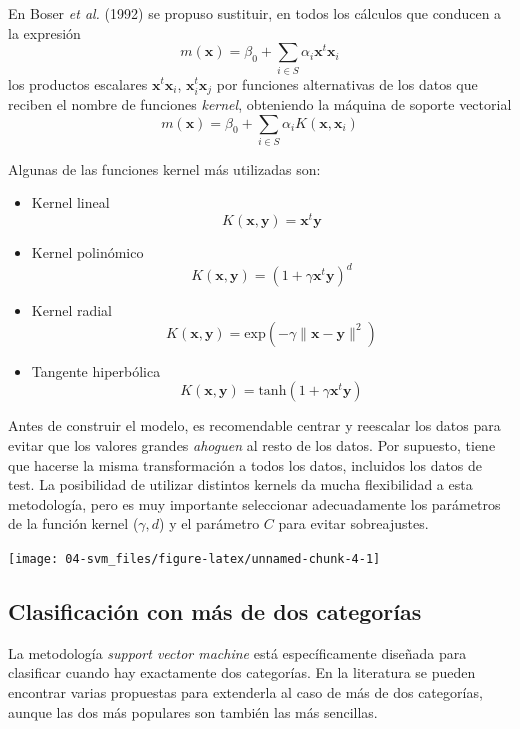 \documentclass[
  spanish,
]{book}
\theoremstyle{break}
\theoremstyle{definition}
\theoremstyle{definition}
\theoremstyle{definition}
\theoremstyle{remark}
\begin{document}
En Boser \emph{et al.} (1992) se propuso sustituir, en todos los cálculos que conducen a la expresión
\[m(\mathbf{x}) = \beta_0 + \sum_{i\in S} \alpha_i \mathbf{x}^t \mathbf{x}_i\]
los productos escalares \(\mathbf{x}^t \mathbf{x}_i\), \(\mathbf{x}_i^t \mathbf{x}_j\) por funciones alternativas de los datos que reciben el nombre de funciones \emph{kernel}, obteniendo la máquina de soporte vectorial
\[m(\mathbf{x}) = \beta_0 + \sum_{i\in S} \alpha_i K(\mathbf{x}, \mathbf{x}_i)\]

Algunas de las funciones kernel más utilizadas son:

\begin{itemize}
\item
  Kernel lineal
  \[K(\mathbf{x}, \mathbf{y}) = \mathbf{x}^t \mathbf{y}\]
\item
  Kernel polinómico
  \[K(\mathbf{x}, \mathbf{y}) = (1 + \gamma \mathbf{x}^t \mathbf{y})^d\]
\item
  Kernel radial
  \[K(\mathbf{x}, \mathbf{y}) = \mbox{exp} (-\gamma \| \mathbf{x} - \mathbf{y} \|^2)\]
\item
  Tangente hiperbólica
  \[K(\mathbf{x}, \mathbf{y}) = \mbox{tanh} (1 + \gamma \mathbf{x}^t \mathbf{y})\]
\end{itemize}

Antes de construir el modelo, es recomendable centrar y reescalar los datos para evitar que los valores grandes \emph{ahoguen} al resto de los datos. Por supuesto, tiene que hacerse la misma transformación a todos los datos, incluidos los datos de test. La posibilidad de utilizar distintos kernels da mucha flexibilidad a esta metodología, pero es muy importante seleccionar adecuadamente los parámetros de la función kernel (\(\gamma,d\)) y el parámetro \(C\) para evitar sobreajustes.

\begin{center}\texttt{[image: 04-svm\_files/figure-latex/unnamed-chunk-4-1]} \end{center}

\hypertarget{clasificaciuxf3n-con-muxe1s-de-dos-categoruxedas}{%
\subsection{Clasificación con más de dos categorías}\label{clasificaciuxf3n-con-muxe1s-de-dos-categoruxedas}}

La metodología \emph{support vector machine} está específicamente diseñada para clasificar cuando hay exactamente dos categorías. En la literatura se pueden encontrar varias propuestas para extenderla al caso de más de dos categorías, aunque las dos más populares son también las más sencillas.
\end{document}
